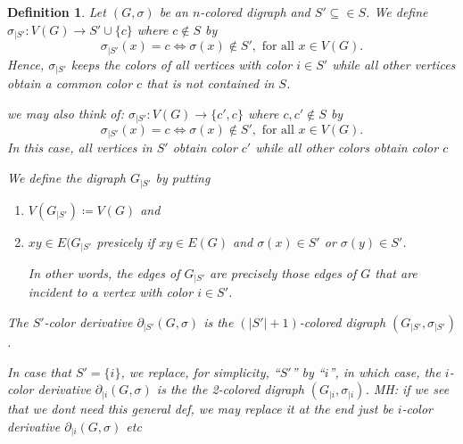 \documentclass[final,3p,times]{elsarticle}
\newtheorem{definition}{Definition}[section]
\newcommand{\TODO}[1]{\begingroup\color{red}#1\endgroup}
\newcommand{\mh}[1]{\begingroup\color{blue}#1\endgroup}
\begin{document}
\begin{definition}
\label{def:color-derivative}
\mh{Let $(G,\sigma)$ be an $n$-colored digraph and $S'\subseteq \in S$. We
    define $\sigma_{|S'}\colon V(G) \to S'\cup \{c\}$ where $c\notin S$ by
    \[\sigma_{|S'}(x)=c \iff \sigma(x)\notin S', \text{ for all } x\in V(G).\] 
    Hence, $\sigma_{|S'}$ keeps the colors of all vertices with
    color $i\in S'$ while all other vertices obtain a common color $c$ that is
    not contained in $S$. 

    \TODO{we may also think of:
    $\sigma_{|S'}\colon V(G) \to \{c',c\}$ where $c,c'\notin S$ by
    \[\sigma_{|S'}(x)=c \iff \sigma(x)\notin S', \text{ for all } x\in V(G).\] 
    In this case, all vertices in $S'$ obtain color $c'$ while all other colors obtain
    color $c$}
    
    We define the digraph $G_{|S'}$ by putting
\begin{enumerate}
    \item $V(G_{|S'}) \coloneqq V(G)$ and
    
    \item $xy\in E(G_{|S'}$  presicely if $xy\in E(G)$ and 
    	  $\sigma(x)\in S'$ or  $\sigma(y)\in S'$.
    	  
    	  In other words, the edges of $G_{|S'}$ are precisely those edges 
    	  of $G$ that are incident to a vertex with color $i\in S'$.
\end{enumerate}
%
	The \emph{$S'$-color derivative} $\partial_{|S'}(G,\sigma)$ is the
	$(|S'|+1)$-colored digraph $(G_{|S'},\sigma_{|S'})$. 
	
	
	In case that $S' = \{i\}$, we replace, for simplicity, ``$S'$'' by ``$i$'',
	in which case, the $i$-color derivative $\partial_{|i}(G,\sigma)$ is
	the the 2-colored digraph $(G_{|i},\sigma_{|i})$.
}
\TODO{\small MH: if we see that we dont need this general def, we may replace it at the end 
just be $i$-color derivative $\partial_{|i}(G,\sigma)$ etc }
\end{definition} 
\end{document}
